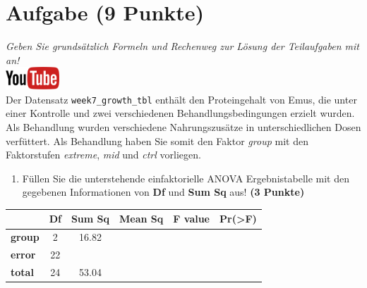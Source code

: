 \documentclass[a4paper, 9pt]{scrartcl}\usepackage[]{graphicx}\usepackage[]{xcolor}
\begin{document}
\clearpage

\section{Aufgabe \hfill (9 Punkte)}

\textit{Geben Sie grunds{\"a}tzlich Formeln und Rechenweg zur L{\"o}sung der
  Teilaufgaben mit an!} \\[1Ex]

\hfill\href{https://youtu.be/IhecxMcCENY}{\includegraphics[width =
  2cm]{img/youtube}}\\[1Ex]




Der Datensatz \texttt{week7\_growth\_tbl} enth{\"a}lt den Proteingehalt von
Emus, die unter einer Kontrolle und zwei verschiedenen
Behandlungsbedingungen erzielt wurden. Als Behandlung wurden verschiedene
Nahrungszus{\"a}tze in unterschiedlichen Dosen verf{\"u}ttert. Als Behandlung haben
Sie somit den Faktor \textit{group} mit den Faktorstufen
\textit{extreme}, \textit{mid} und
\textit{ctrl} vorliegen.



\begin{enumerate}
\item F{\"u}llen Sie die unterstehende einfaktorielle ANOVA Ergebnistabelle 
  mit den gegebenen Informationen von \textbf{Df} und \textbf{Sum Sq} aus!
  \textbf{(3 Punkte)}
\end{enumerate}

\vspace{1Ex}

\begin{center}
  \Large
  \begin{tabular}{l|c|c|c|c|c}
     & \textbf{Df} & \textbf{Sum Sq} & \textbf{Mean Sq} & \textbf{F value} & \textbf{Pr(>F)} \strut\\
    \hline
   \textbf{group}  & 2 & 16.82 &  &  &  \strut\\
    \hline
   \textbf{error}  & 22 &  &  &  &  \strut\\
        \hline
   \textbf{total}  & 24 & 53.04 &  &  &  \strut\\
  \end{tabular}
\end{center}
\end{document}
